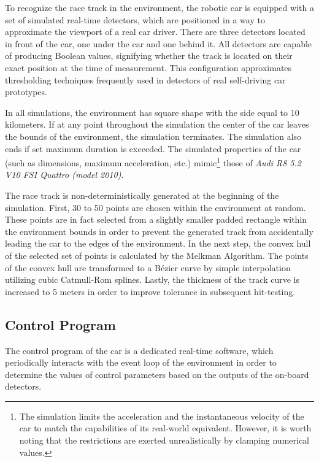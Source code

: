 To recognize the race track in the environment, the robotic car is equipped with a set of simulated real-time detectors, which are positioned in a way to approximate the viewport of a real car driver. There are three detectors located in front of the car, one under the car and one behind it. All detectors are capable of producing Boolean values, signifying whether the track is located on their exact position at the time of measurement. This configuration approximates thresholding techniques frequently used in detectors of real self-driving car prototypes.

In all simulations, the environment has square shape with the side equal to 10 kilometers. If at any point throughout the simulation the center of the car leaves the bounds of the environment, the simulation terminates. The simulation also ends if set maximum duration is exceeded. The simulated properties of the car (such as dimensions, maximum acceleration, etc.) mimic\footnote{The simulation limits the acceleration and the instantaneous velocity of the car to match the capabilities of its real-world equivalent. However, it is worth noting that the restrictions are exerted unrealistically by clamping numerical values.} those of \textit{Audi R8 5.2 V10 FSI Quattro (model 2010)}.

The race track is non-deterministically generated at the beginning of the simulation. First, 30 to 50 points are chosen within the environment at random. These points are in fact selected from a slightly smaller padded rectangle within the environment bounds in order to prevent the generated track from accidentally leading the car to the edges of the environment. In the next step, the convex hull of the selected set of points is calculated by the Melkman Algorithm. \cite{MelkmanConvexHull} The points of the convex hull are transformed to a Bézier curve by simple interpolation utilizing cubic Catmull-Rom splines. \cite{CatmullRomSplines} Lastly, the thickness of the track curve is increased to 5 meters in order to improve tolerance in subsequent hit-testing.

\subsection{Control Program}
The control program of the car is a dedicated real-time software, which periodically interacts with the event loop of the environment in order to determine the values of control parameters based on the outputs of the on-board detectors.

